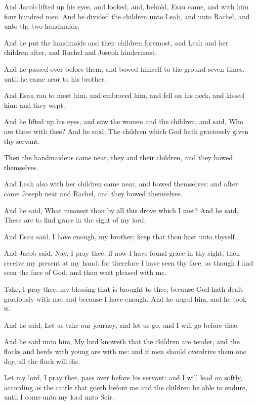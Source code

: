 \verse And Jacob lifted up his eyes, and looked, and, behold, Esau came,
and with him four hundred men. And he divided the children unto Leah,
and unto Rachel, and unto the two handmaids.

\verse And he put the handmaids and their children foremost, and Leah
and her children after, and Rachel and Joseph hindermost.

\verse And he passed over before them, and bowed himself to the ground
seven times, until he came near to his brother.

\verse And Esau ran to meet him, and embraced him, and fell on his neck,
and kissed him: and they wept.

\verse And he lifted up his eyes, and saw the women and the children;
and said, Who are those with thee? And he said, The children which God
hath graciously given thy servant.

\verse Then the handmaidens came near, they and their children, and they
bowed themselves.

\verse And Leah also with her children came near, and bowed themselves:
and after came Joseph near and Rachel, and they bowed themselves.

\verse And he said, What meanest thou by all this drove which I met? And
he said, These are to find grace in the sight of my lord.

\verse And Esau said, I have enough, my brother; keep that thou hast
unto thyself.

\verse And Jacob said, Nay, I pray thee, if now I have found grace in
thy sight, then receive my present at my hand: for therefore I have
seen thy face, as though I had seen the face of God, and thou wast
pleased with me.

\verse Take, I pray thee, my blessing that is brought to thee; because
God hath dealt graciously with me, and because I have enough. And he
urged him, and he took it.

\verse And he said, Let us take our journey, and let us go, and I will
go before thee.

\verse And he said unto him, My lord knoweth that the children are
tender, and the flocks and herds with young are with me: and if men
should overdrive them one day, all the flock will die.

\verse Let my lord, I pray thee, pass over before his servant: and I
will lead on softly, according as the cattle that goeth before me and
the children be able to endure, until I come unto my lord unto Seir.

